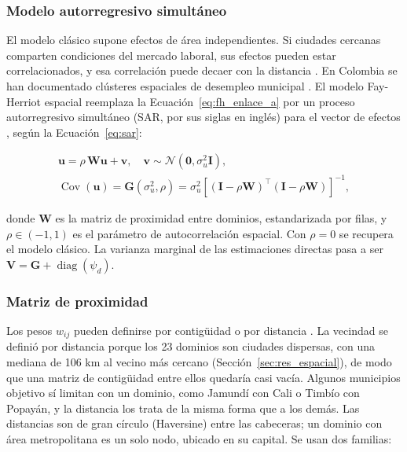 \subsubsection{Modelo autorregresivo simultáneo}

El modelo clásico supone efectos de área independientes. Si ciudades cercanas comparten condiciones del mercado laboral, sus efectos pueden estar correlacionados, y esa correlación puede decaer con la distancia \cite[p.~114]{PratesiSalvati2008}. En Colombia se han documentado clústeres espaciales de desempleo municipal \cite[pp.~123--124]{Diaz2016}. El modelo Fay-Herriot espacial reemplaza la Ecuación~\ref{eq:fh_enlace_a} por un proceso autorregresivo simultáneo (SAR, por sus siglas en inglés) para el vector de efectos \cite[pp.~490--491]{morales2021smallarea}, según la Ecuación~\ref{eq:sar}:

\begin{equation}
    \begin{gathered}
    \mathbf{u} = \rho\,\mathbf{W}\mathbf{u} + \mathbf{v}, \quad \mathbf{v} \sim \mathcal{N}(\mathbf{0}, \sigma_u^2 \mathbf{I}), \\ \operatorname{Cov}(\mathbf{u}) = \mathbf{G}(\sigma_u^2,\rho) = \sigma_u^2\left[(\mathbf{I}-\rho\mathbf{W})^\top(\mathbf{I}-\rho\mathbf{W})\right]^{-1},
    \end{gathered}
    \label{eq:sar}
\end{equation}

donde $\mathbf{W}$ es la matriz de proximidad entre dominios, estandarizada por filas, y $\rho \in (-1, 1)$ es el parámetro de autocorrelación espacial. Con $\rho = 0$ se recupera el modelo clásico. La varianza marginal de las estimaciones directas pasa a ser $\mathbf{V} = \mathbf{G} + \operatorname{diag}(\psi_d)$.

\subsubsection{Matriz de proximidad}

Los pesos $w_{ij}$ pueden definirse por contigüidad o por distancia \cite[p.~491]{morales2021smallarea}. La vecindad se definió por distancia porque los 23 dominios son ciudades dispersas, con una mediana de 106 km al vecino más cercano (Sección~\ref{sec:res_espacial}), de modo que una matriz de contigüidad entre ellos quedaría casi vacía. Algunos municipios objetivo sí limitan con un dominio, como Jamundí con Cali o Timbío con Popayán, y la distancia los trata de la misma forma que a los demás. Las distancias son de gran círculo (Haversine) entre las cabeceras; un dominio con área metropolitana es un solo nodo, ubicado en su capital. Se usan dos familias:

